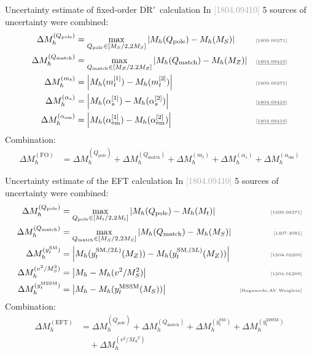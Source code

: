 \documentclass[hyperref={pdfpagelabels=false},ngerman]{beamer}
\newcommand{\MS}{\ensuremath{M_S}}
\newcommand{\mycite}[1]{\ensuremath{\text{\textcolor{darkgray}{\tiny [#1]}}}}
\newcommand{\bigcite}[1]{\textcolor{darkgray}{[#1]}}
\newcommand{\DRbarp}{\ensuremath{\overline{\text{DR}}'}}
\newcommand{\SM}{\ensuremath{\text{SM}}}
\newcommand{\MSSM}{\ensuremath{\text{MSSM}}}
\newcommand{\as}{\alpha_s}
\newcommand{\aem}{\alpha_\text{em}}
\newcommand{\Qpole}{\ensuremath{Q_\text{pole}}}
\newcommand{\Qmatch}{\ensuremath{Q_\text{match}}}
\newcommand{\DMh}{\ensuremath{\Delta M_h^{(\text{FO})}}}
\newcommand{\DMhQpole}{\ensuremath{\Delta M_h^{(\Qpole)}}}
\newcommand{\DMhQmatch}{\ensuremath{\Delta M_h^{(\Qmatch)}}}
\newcommand{\DMhMt}{\ensuremath{\Delta M_h^{(m_t)}}}
\newcommand{\DMhAlphaS}{\ensuremath{\Delta M_h^{(\as)}}}
\newcommand{\DMhAlphaEm}{\ensuremath{\Delta M_h^{(\aem)}}}
\newcommand{\DMhHSSUSY}{\ensuremath{\Delta M_h^{(\text{EFT})}}}
\newcommand{\DMhHSSUSYytSM}{\ensuremath{\Delta M_h^{(y_t^\SM)}}}
\newcommand{\DMhHSSUSYytMSSM}{\ensuremath{\Delta M_h^{(y_t^\MSSM)}}}
\newcommand{\DMhEFT}{\ensuremath{\Delta M_h^{(v^2/\MS^2)}}}
\begin{document}

\begin{frame}[noframenumbering]{Uncertainty estimate of fixed-order \DRbarp\ calculation}
  In \bigcite{1804.09410} 5 sources of uncertainty were combined:
  \begin{align*}
    \DMhQpole &= \max_{\Qpole\in[\MS/2,2\MS]}\left|M_h(\Qpole) - M_h(\MS)\right| & \text{\mycite{1609.00371}} \\
    \DMhQmatch &= \max_{\Qmatch\in[M_Z/2,2M_Z]}\left|M_h(\Qmatch) - M_h(M_Z)\right| & \text{\mycite{\underline{1804.09410}}} \\
    \DMhMt &= \left|M_h(m_t^{[1]}) - M_h(m_t^{[2]})\right| & \text{\mycite{1609.00371}} \\
    \DMhAlphaS &= \left| M_h(\as^{[1]}) - M_h(\as^{[2]}) \right| & \text{\mycite{\underline{1804.09410}}} \\
    \DMhAlphaEm &= \left| M_h(\aem^{[1]}) - M_h(\aem^{[2]}) \right| & \text{\mycite{\underline{1804.09410}}}
  \end{align*}
  Combination:
  \begin{align*}
    \DMh &= \DMhQpole + \DMhQmatch + \DMhMt + \DMhAlphaS + \DMhAlphaEm 
  \end{align*}
\end{frame}


\begin{frame}[noframenumbering]{Uncertainty estimate of the EFT calculation}
  In \bigcite{1804.09410} 5 sources of uncertainty were combined:
  \begin{align*}
    \DMhQpole &= \max_{\Qpole\in[M_t/2,2M_t]}\left|M_h(\Qpole) - M_h(M_t)\right| & \text{\mycite{1609.00371}} \\
    \DMhQmatch &= \max_{\Qmatch\in[\MS/2,2\MS]}\left|M_h(\Qmatch) - M_h(\MS)\right| & \text{\mycite{1407.4081}} \\
    \DMhHSSUSYytSM &= \left| M_h(y_t^{\SM,(2L)}(M_Z)) - M_h(y_t^{\SM,(3L)}(M_Z)) \right| & \text{\mycite{1504.05200}} \\
    \DMhEFT &= \left| M_h - M_h(v^2/\MS^2) \right| & \text{\mycite{1504.05200}} \\
    \DMhHSSUSYytMSSM &= \left| M_h - M_h(y_t^\MSSM(\MS)) \right| & \text{\mycite{Bagnaschi,AV,Weiglein}}
  \end{align*}
  Combination:
  \begin{align*}
    \DMhHSSUSY &= \DMhQpole + \DMhQmatch + \DMhHSSUSYytSM + \DMhHSSUSYytMSSM \\
    &\quad + \DMhEFT
  \end{align*}
\end{frame}
\end{document}
